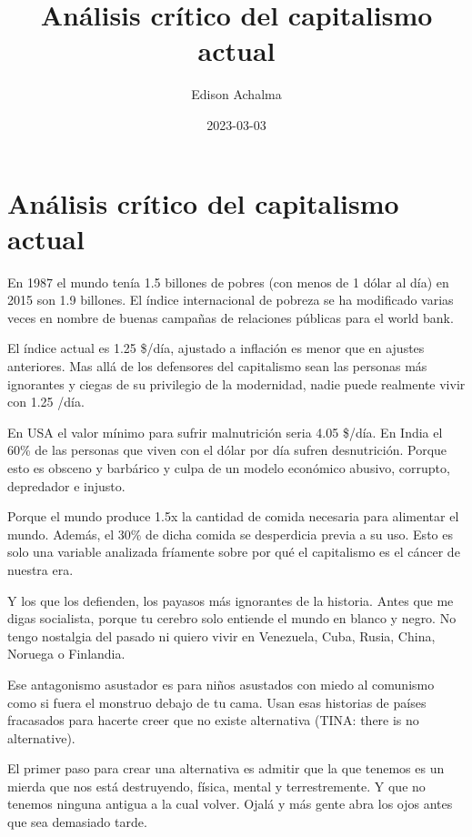 \documentclass[
  jou,
  floatsintext,
  longtable,
  a4paper,
  nolmodern,
  notxfonts,
  notimes,
  12pt,
  colorlinks=true,linkcolor=blue,citecolor=blue,urlcolor=blue]{apa7}
\title{Análisis crítico del capitalismo actual}
\author{Edison Achalma}
\affiliation{
{Escuela Profesional de Economía, Universidad Nacional de San Cristóbal
de Huamanga}}
\date{2023-03-03}
\begin{document}
\maketitle


\hypertarget{toc}{}
\tableofcontents
\newpage
\section[Introduction]{Análisis crítico del capitalismo actual}

\setcounter{secnumdepth}{3}

\setlength\LTleft{0pt}




En 1987 el mundo tenía 1.5 billones de pobres (con menos de 1 dólar al
día) en 2015 son 1.9 billones. El índice internacional de pobreza se ha
modificado varias veces en nombre de buenas campañas de relaciones
públicas para el world bank.

El índice actual es 1.25 \$/día, ajustado a inflación es menor que en
ajustes anteriores. Mas allá de los defensores del capitalismo sean las
personas más ignorantes y ciegas de su privilegio de la modernidad,
nadie puede realmente vivir con 1.25 /día.

En USA el valor mínimo para sufrir malnutrición seria 4.05 \$/día. En
India el 60\% de las personas que viven con el dólar por día sufren
desnutrición. Porque esto es obsceno y barbárico y culpa de un modelo
económico abusivo, corrupto, depredador e injusto.

Porque el mundo produce 1.5x la cantidad de comida necesaria para
alimentar el mundo. Además, el 30\% de dicha comida se desperdicia
previa a su uso. Esto es solo una variable analizada fríamente sobre por
qué el capitalismo es el cáncer de nuestra era.

Y los que los defienden, los payasos más ignorantes de la historia.
Antes que me digas socialista, porque tu cerebro solo entiende el mundo
en blanco y negro. No tengo nostalgia del pasado ni quiero vivir en
Venezuela, Cuba, Rusia, China, Noruega o Finlandia.

Ese antagonismo asustador es para niños asustados con miedo al comunismo
como si fuera el monstruo debajo de tu cama. Usan esas historias de
países fracasados para hacerte creer que no existe alternativa (TINA:
there is no alternative).

El primer paso para crear una alternativa es admitir que la que tenemos
es un mierda que nos está destruyendo, física, mental y terrestremente.
Y que no tenemos ninguna antigua a la cual volver. Ojalá y más gente
abra los ojos antes que sea demasiado tarde.
\end{document}
